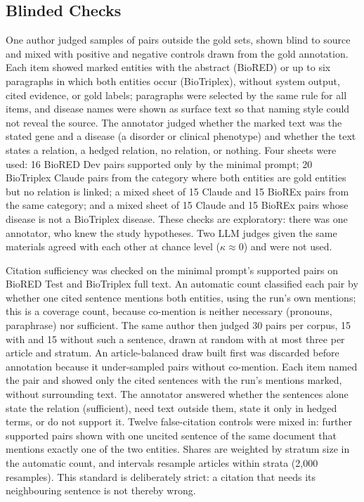 \documentclass[preprint,10pt,letterpaper]{elsarticle}
\begin{document}
\subsection{Blinded Checks}\label{sec:checks}
One author judged samples of pairs outside the gold sets, shown blind to source and mixed with positive and negative controls drawn from the gold annotation. Each item showed marked entities with the abstract (BioRED) or up to six paragraphs in which both entities occur (BioTriplex), without system output, cited evidence, or gold labels; paragraphs were selected by the same rule for all items, and disease names were shown as surface text so that naming style could not reveal the source. The annotator judged whether the marked text was the stated gene and a disease (a disorder or clinical phenotype) and whether the text states a relation, a hedged relation, no relation, or nothing. Four sheets were used: 16 BioRED Dev pairs supported only by the minimal prompt; 20 BioTriplex Claude pairs from the category where both entities are gold entities but no relation is linked; a mixed sheet of 15 Claude and 15 BioREx pairs from the same category; and a mixed sheet of 15 Claude and 15 BioREx pairs whose disease is not a BioTriplex disease. These checks are exploratory: there was one annotator, who knew the study hypotheses. Two LLM judges given the same materials agreed with each other at chance level ($\kappa \approx 0$) and were not used.

Citation sufficiency was checked on the minimal prompt's supported pairs on BioRED Test and BioTriplex full text. An automatic count classified each pair by whether one cited sentence mentions both entities, using the run's own mentions; this is a coverage count, because co-mention is neither necessary (pronouns, paraphrase) nor sufficient. The same author then judged 30 pairs per corpus, 15 with and 15 without such a sentence, drawn at random with at most three per article and stratum. An article-balanced draw built first was discarded before annotation because it under-sampled pairs without co-mention. Each item named the pair and showed only the cited sentences with the run's mentions marked, without surrounding text. The annotator answered whether the sentences alone state the relation (sufficient), need text outside them, state it only in hedged terms, or do not support it. Twelve false-citation controls were mixed in: further supported pairs shown with one uncited sentence of the same document that mentions exactly one of the two entities. Shares are weighted by stratum size in the automatic count, and intervals resample articles within strata (2,000 resamples). This standard is deliberately strict: a citation that needs its neighbouring sentence is not thereby wrong.
\end{document}
